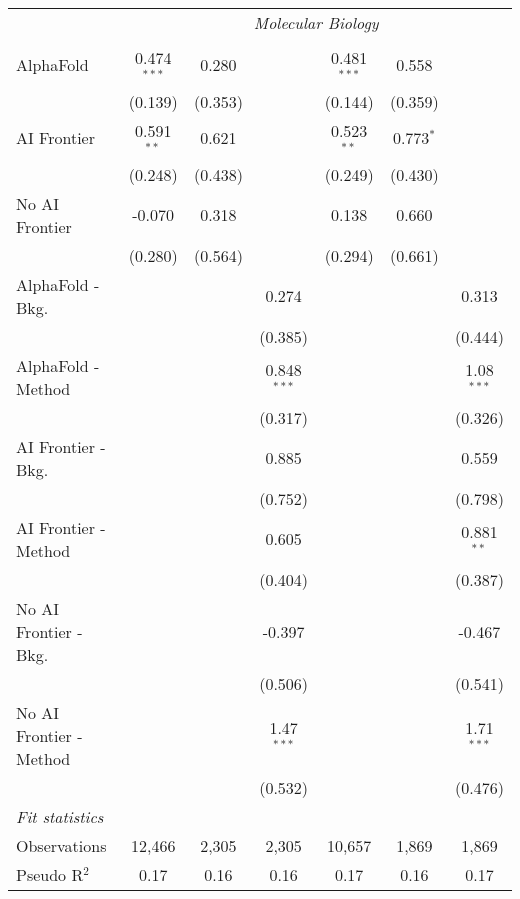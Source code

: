 \begin{tabular}{lcccccc}
 & \multicolumn{6}{c}{\textit{Molecular Biology}} \\ \\
   AlphaFold               & 0.474$^{***}$ & 0.280   &               & 0.481$^{***}$ & 0.558       &   \\   
                           & (0.139)       & (0.353) &               & (0.144)       & (0.359)     &   \\   
   AI Frontier             & 0.591$^{**}$  & 0.621   &               & 0.523$^{**}$  & 0.773$^{*}$ &   \\   
                           & (0.248)       & (0.438) &               & (0.249)       & (0.430)     &   \\   
   No AI Frontier          & -0.070        & 0.318   &               & 0.138         & 0.660       &   \\   
                           & (0.280)       & (0.564) &               & (0.294)       & (0.661)     &   \\   
   AlphaFold - Bkg.        &               &         & 0.274         &               &             & 0.313\\   
                           &               &         & (0.385)       &               &             & (0.444)\\   
   AlphaFold - Method      &               &         & 0.848$^{***}$ &               &             & 1.08$^{***}$\\   
                           &               &         & (0.317)       &               &             & (0.326)\\   
   AI Frontier - Bkg.      &               &         & 0.885         &               &             & 0.559\\   
                           &               &         & (0.752)       &               &             & (0.798)\\   
   AI Frontier - Method    &               &         & 0.605         &               &             & 0.881$^{**}$\\   
                           &               &         & (0.404)       &               &             & (0.387)\\   
   No AI Frontier - Bkg.   &               &         & -0.397        &               &             & -0.467\\   
                           &               &         & (0.506)       &               &             & (0.541)\\   
   No AI Frontier - Method &               &         & 1.47$^{***}$  &               &             & 1.71$^{***}$\\   
                           &               &         & (0.532)       &               &             & (0.476)\\   
   \midrule
   \emph{Fit statistics}\\
   Observations            & 12,466        & 2,305   & 2,305         & 10,657        & 1,869       & 1,869\\  
   Pseudo R$^2$            & 0.17          & 0.16    & 0.16          & 0.17          & 0.16        & 0.17\\  
   

\end{tabular}
